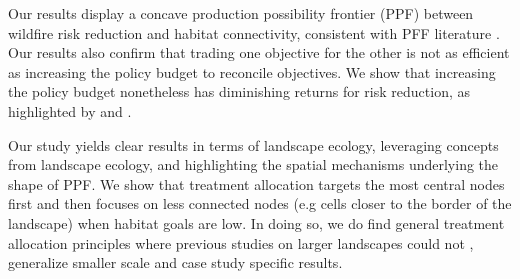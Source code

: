 Our results display a concave production possibility frontier (PPF) between wildfire risk reduction and habitat connectivity, consistent with PFF literature \citep{arthaud_methodology_1996,calkin_modeling_2005}. Our results also confirm that trading one objective for the other is not as efficient as increasing the policy budget to reconcile objectives. We show that increasing the policy budget nonetheless has diminishing returns for risk reduction, as highlighted by \cite{wei_optimization_2008, yemshanov_detecting_2021} and \cite{pais_cell2fire_2021}. 

Our study yields clear results in terms of landscape ecology, leveraging concepts from landscape ecology, and highlighting the spatial mechanisms underlying the shape of PPF. We show that treatment allocation targets the most central nodes first and then focuses on less connected nodes (e.g cells closer to the border of the landscape) when habitat goals are low. In doing so, we do find general treatment allocation principles where previous studies on larger landscapes could not \citep{minas_spatial_2014, rachmawati_optimisation_2016}, generalize smaller scale \citep{konoshima_spatial-endogenous_2008} and case study specific \citep{yemshanov_detecting_2021, pais_downstream_2021} results.

